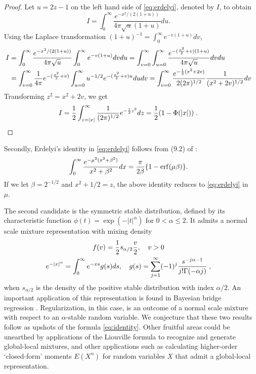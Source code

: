 \documentclass[lineno]{biometrika}
\begin{document}
\begin{proof}
Let $ u = 2z-1$ on the left hand side of \eqref{eq:erdelyi}, denoted by $I$, to obtain 
$$
I = \int_{0}^{\infty} \frac{e^{-x^2/(2(1+u))}}{4 \pi \sqrt{u} (1+u)} du.
$$
Using the Laplace transformation $(1+u)^{-1} = \int_0^{\infty} e^{-v(1+u)} dv$, 
\begin{align*}
  I &= \int_{0}^{\infty} \frac{e^{-x^2/(2(1+u))}}{4 \pi \sqrt{u}} 
  \int_0^{\infty} e^{-v(1+u)} dv du 
  = \int_{v= 0}^{\infty} \int_{u=0}^{\infty} 
  \frac{e^{-(\frac{x^2}{2} + v)(1+u)}}{4 \pi \sqrt{u}} dv du
  \\
  &= \int_{v= 0}^{\infty} \frac{1}{4\pi} e^{-(\frac{x^2}{2} + v)} 
  \int_{u=0}^{\infty} u^{-1/2} e^{-(\frac{x^2}{2} + v) u} du dv 
  = \int_{v= 0}^{\infty} \frac{ e^{-\frac{1}{2}(x^2 + 2v)}}{2 (2\pi)^{1/2}} 
  \frac{1}{(x^2+ 2v)^{1/2}} dv
  \\
\end{align*}
Transforming $z^2 = x^2 + 2v$, we get 
$$
I =\frac{1}{2}  \int_{z = |x|}^{\infty} \frac{1}{(2\pi)^{1/2}} e^{-\frac{1}{2} z^2} dz 
= \frac{1}{2} (1 - \Phi(|x|))
\;.
$$
\end{proof}
Secondly, Erdelyi's identity in \eqref{eq:erdelyi} follows from (9.2) of
\cite{amdeberhan_cauchy-schlomilch_2010}: 
$$
\int_0^{\infty} \frac{e^{-\mu^2 (x^2 + \beta^2)}}{x^2+\beta^2} dx 
= \frac{\pi}{2 \beta} \{ 1 - {\rm erf}(\mu \beta) \}.
$$
If we let $\beta = 2^{-1/2}$ and $x^2+1/2 = z$, the above identity reduces to
\eqref{eq:erdelyi} in $\mu$. 

The second candidate is the symmetric stable distribution, defined by its
characteristic function $\phi(t) = \exp( -|t|^{\alpha})$ for $0 < \alpha \leq 2$.  
It admits a normal scale mixture representation with mixing density 
\begin{gather*}
  f(v) = \frac{1}{2} s_{\alpha/2} \frac{v}{2},\quad v > 0 
  \\
  e^{-|x|^\alpha} = \int_0^{\infty} e^{-xs} g(s) ds, \quad g(s) 
  = \sum_{j=1}^{\infty} (-1)^j \frac{s^{-j\alpha-1}}{j! \Gamma(-\alpha j)}
  \;,
\end{gather*}
when $s_{\alpha/2}$ is the density of the positive stable distribution with index 
$\alpha / 2$.  An important application of this representation is found in
Bayesian bridge regression \citep{polson_bayesian_2014}.  Regularization, in this
case, is an outcome of a normal scale mixture with respect to an
$\alpha$-stable random variable.  We conjecture that these two results follow
as upshots of the \CS{} formula \eqref{eq:identity}. Other fruitful areas could
be unearthed by applications of the Liouville formula to recognize and generate
global-local mixtures, and other applications such as calculating higher-order
`closed-form' moments $E(X^n)$ for random variables $X$ that admit a
global-local representation. 



\end{document}
